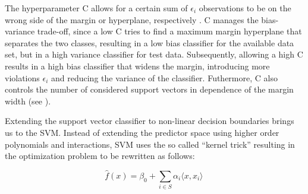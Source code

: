 The hyperparameter C allows for a certain sum of $\epsilon_i$ observations to be on the wrong side of the margin or hyperplane, respectively \cite{James:2014:ISL:2517747}. C manages the bias-variance trade-off, since a low C tries to find a maximum margin hyperplane that separates the two classes, resulting in a low bias classifier for the available data set, but in a high variance classifier for test data. Subsequently, allowing a high C results in a high bias classifier that widens the margin, introducing more violations $\epsilon_i$ and reducing the variance of the classifier. Futhermore, C also controls the number of considered support vectors in dependence of the margin width (see \cite{efron_hastie_2016}).

Extending the support vector classifier to non-linear decision boundaries brings us to the SVM. Instead of extending the predictor space using higher order polynomials and interactions, SVM uses the so called ``kernel trick'' \cite{efron_hastie_2016} resulting in the optimization problem to be rewritten as follows:

\begin{equation}
  \hat f(x) = \beta_0 + \sum_{i \in S} \alpha_i \langle x, x_i \rangle \,
\end{equation}

